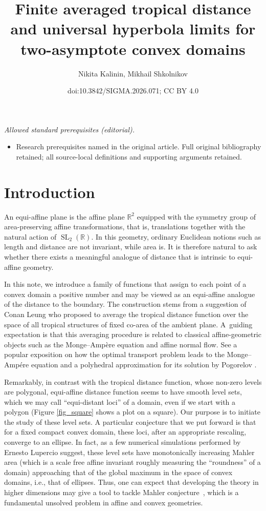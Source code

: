 \documentclass[10pt,a4paper]{amsart}
\title{Finite averaged tropical distance and universal hyperbola limits for two-asymptote convex domains}
\author{Nikita Kalinin, Mikhail Shkolnikov}
\date{doi:10.3842/SIGMA.2026.071; CC BY 4.0}
\numberwithin{equation}{section}
\theoremstyle{definition}
\begin{document}
\maketitle
\noindent\textit{Allowed standard prerequisites (editorial).}\begin{itemize}
\item Research prerequisites named in the original article. Full original bibliography retained; all source-local definitions and supporting arguments retained.
\end{itemize}\medskip
\section{Introduction}

An equi-affine plane is the affine plane $\mathbb{R}^2$ equipped with the symmetry group of area-preserving affine transformations, that is, translations together with the natural action of $\operatorname{SL}_2(\mathbb{R})$. In this geometry, ordinary Euclidean notions such as length and distance are not invariant, while area is. It is therefore natural to ask whether there exists a meaningful analogue of distance that is intrinsic to equi-affine geometry.

In this note, we introduce a family of functions that assign to each point of a convex domain a positive number and may be viewed as an equi-affine analogue of the distance to the boundary. The construction stems from a suggestion of Conan Leung who proposed to average the tropical distance function over the space of all tropical structures of fixed co-area of the ambient plane. A~guiding expectation is that this averaging procedure is related to classical affine-geometric objects such as the Monge--Amp\`ere equation and affine normal flow. See a popular exposition on how the optimal transport problem leads to the Monge--Amp\'ere equation \cite{caffarelli2004monge} and a polyhedral approximation for its solution by Pogorelov \cite{gutierrez2016monge, pogorelov1964monge,pogorelov1971regularity, pogorelov1975minkowski,1988}.

Remarkably, in contrast with the tropical distance function, whose non-zero levels are polygonal, equi-affine distance function seems to have smooth level sets, which we may call ``equi-distant loci'' of a domain, even if we start with a polygon (Figure \ref{fig_square} shows a plot on a square). Our purpose is to initiate the study of these level sets. A particular conjecture that we put forward is that for a fixed compact convex domain, these loci, after an appropriate rescaling, converge to an ellipse. In fact, as a few numerical simulations performed by Ernesto Lupercio suggest, these level sets have monotonically increasing Mahler area (which is a scale free affine invariant roughly measuring the ``roundness'' of a domain) approaching that of the global maximum in the space of convex domains, i.e., that of ellipses. Thus, one can expect that developing the theory in higher dimensions may give a tool to tackle Mahler conjecture~\cite{mahler}, which is a fundamental unsolved problem in affine and convex geometries.
\end{document}
